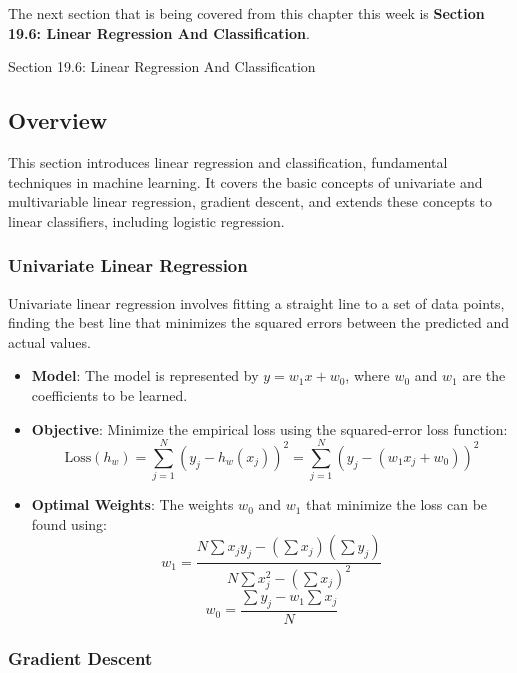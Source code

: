 The next section that is being covered from this chapter this week is \textbf{Section 19.6: Linear Regression And Classification}.

\begin{notes}{Section 19.6: Linear Regression And Classification}
    \subsection*{Overview}

    This section introduces linear regression and classification, fundamental techniques in machine learning. It covers the basic concepts of univariate and multivariable linear regression, gradient descent, 
    and extends these concepts to linear classifiers, including logistic regression.
    
    \subsubsection*{Univariate Linear Regression}
    
    Univariate linear regression involves fitting a straight line to a set of data points, finding the best line that minimizes the squared errors between the predicted and actual values.
    
    \begin{highlight}
    
        \begin{itemize}
            \item \textbf{Model}: The model is represented by $y = w_1x + w_0$, where $w_0$ and $w_1$ are the coefficients to be learned.
            \item \textbf{Objective}: Minimize the empirical loss using the squared-error loss function:
            \[
            \text{Loss}(h_w) = \sum_{j=1}^{N} (y_j - h_w(x_j))^2 = \sum_{j=1}^{N} (y_j - (w_1x_j + w_0))^2
            \]
            \item \textbf{Optimal Weights}: The weights $w_0$ and $w_1$ that minimize the loss can be found using:
            \[
            w_1 = \frac{N\sum x_jy_j - (\sum x_j)(\sum y_j)}{N\sum x_j^2 - (\sum x_j)^2}
            \]
            \[
            w_0 = \frac{\sum y_j - w_1\sum x_j}{N}
            \]
        \end{itemize}
    
    \end{highlight}
    
    \subsubsection*{Gradient Descent}
    

\end{notes}
